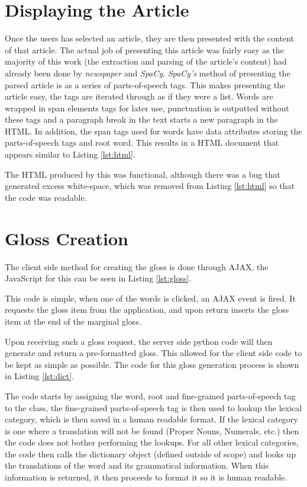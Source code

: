 \section{Displaying the Article}

Once the users has selected an article, they are then presented with the content of that article. The actual job of presenting this article was fairly easy as the majority of this work (the extraction and parsing of the article's content) had already been done by \textit{newspaper} and \textit{SpaCy}. \textit{SpaCy's} method of presenting the parsed article is as a series of parts-of-speech tags. This makes presenting the article easy, the tags are iterated through as if they were a list. Words are wrapped in span elements tags for later use, punctuation is outputted without these tags and a paragraph break in the text starts a new paragraph in the HTML. In addition, the span tags used for words have data attributes storing the parts-of-speech tags and root word. This results in a HTML document that appears similar to Listing \ref{lst:html}.



The HTML produced by this was functional, although there was a bug that generated excess white-space, which was removed from Listing \ref{lst:html} so that the code was readable. 

\section{Gloss Creation}

The client side method for creating the gloss is done through AJAX, the JavaScript for this can be seen in Listing \ref{lst:gloss}.



This code is simple, when one of the words is clicked, an AJAX event is fired. It requests the gloss item from the application, and upon return inserts the gloss item at the end of the marginal gloss.

Upon receiving such a gloss request, the server side python code will then generate and return a pre-formatted gloss. This allowed for the client side code to be kept as simple as possible. The code for this gloss generation process is shown in Listing \ref{lst:dict}.



The code starts by assigning the word, root and fine-grained parts-of-speech tag to the class, the fine-grained parts-of-speech tag is then used to lookup the lexical category, which is then saved in a human readable format.  If the lexical category is one where a translation will not be found (Proper Nouns, Numerals, etc.) then the code does not bother performing the lookups. For all other lexical categories, the code then calls the dictionary object (defined outside of scope) and looks up the translations of the word and its grammatical information. When this information is returned, it then proceeds to format it so it is human readable.

